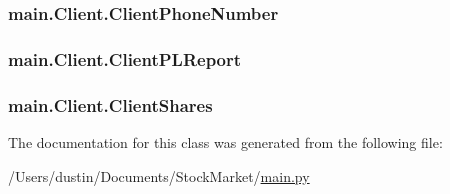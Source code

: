 \subsubsection[{Client\+Phone\+Number}]{\setlength{\rightskip}{0pt plus 5cm}main.\+Client.\+Client\+Phone\+Number}\label{classmain_1_1_client_a79a42677f33123c894d9d00f12151862}
\hypertarget{classmain_1_1_client_a0a9203d6158520283fe26d6ad94b2cb1}{}
\subsubsection[{Client\+P\+L\+Report}]{\setlength{\rightskip}{0pt plus 5cm}main.\+Client.\+Client\+P\+L\+Report}\label{classmain_1_1_client_a0a9203d6158520283fe26d6ad94b2cb1}
\hypertarget{classmain_1_1_client_ac367be189adcc4e5fccc5008cd95b30a}{}
\subsubsection[{Client\+Shares}]{\setlength{\rightskip}{0pt plus 5cm}main.\+Client.\+Client\+Shares}\label{classmain_1_1_client_ac367be189adcc4e5fccc5008cd95b30a}


The documentation for this class was generated from the following file\+:\begin{DoxyCompactItemize}
\item 
/\+Users/dustin/\+Documents/\+Stock\+Market/\hyperlink{main_8py}{main.\+py}\end{DoxyCompactItemize}
